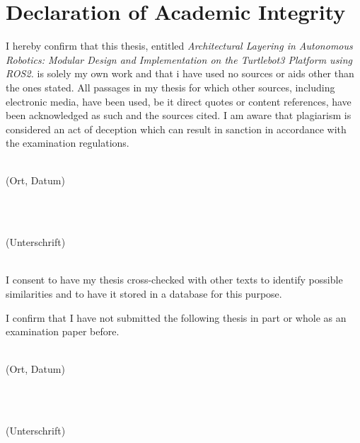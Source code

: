 \chapter*{Declaration of Academic Integrity}
I hereby confirm that this thesis, entitled \textit{Architectural Layering in Autonomous Robotics: Modular Design and Implementation on the Turtlebot3 Platform using ROS2.} is solely my own work and that i have used no sources or aids other than the ones stated. All passages in my thesis for which other sources, including electronic media, have been used, be it direct quotes or content references, have been acknowledged as such and the sources cited. I am aware that plagiarism is considered an act of deception which can result in sanction in accordance with the examination regulations.

\vspace*{2cm}

\begin{minipage}{0.5\textwidth}
  \begin{flushleft} \large
    \underline{\hspace{6cm}} \\
    {\footnotesize (Ort, Datum)}
  \end{flushleft}
\end{minipage}
~
\begin{minipage}{0.5\textwidth}
  \begin{flushright} \large
    \underline{\hspace{6cm}} \\
    {\footnotesize (Unterschrift)}
  \end{flushright}
\end{minipage}\\[0.5cm]


I consent to have my thesis cross-checked with other texts to identify possible similarities and to have it stored in a database for this purpose. 

I confirm that I have not submitted the following thesis in part or whole as an examination paper before. 

\vspace*{2cm}

\begin{minipage}{0.5\textwidth}
	\begin{flushleft} \large
		\underline{\hspace{6cm}} \\
		{\footnotesize (Ort, Datum)}
	\end{flushleft}
\end{minipage}
~
\begin{minipage}{0.5\textwidth}
	\begin{flushright} \large
		\underline{\hspace{6cm}} \\
		{\footnotesize (Unterschrift)}
	\end{flushright}
\end{minipage}\\[0.5cm]